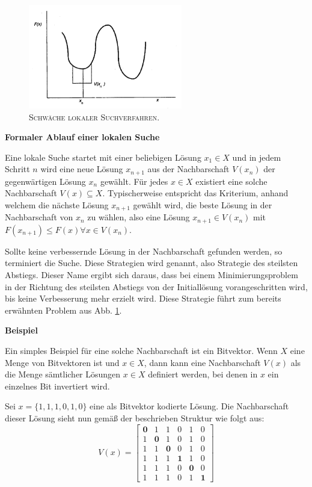 \begin{figure}[H]
\centering
\includegraphics[width=0.6\textwidth]{img/local_minimum.png}
\caption{\textsc{Schwäche lokaler Suchverfahren. \cite{Pirlot1996}}}
\label{fig:local_search_weakness}
\end{figure}

\textbf{Formaler Ablauf einer lokalen Suche}

Eine lokale Suche startet mit einer beliebigen Lösung $x_1 \in X$ und in jedem Schritt $n$
wird eine neue Lösung $x_{n+1}$ aus der Nachbarschaft $V(x_n)$ der gegenwärtigen Lösung $x_n$ gewählt.
Für jedes $x \in X$ existiert eine solche Nachbarschaft $V(x) \subseteq X$.
Typischerweise entspricht das Kriterium, anhand welchem die nächste Lösung $x_{n+1}$ gewählt wird,
die beste Lösung in der Nachbarschaft von $x_n$ zu wählen, also eine Lösung $x_{n+1} \in V(x_n)$
mit $F(x_{n+1}) \leq F(x) \forall x \in V(x_n)$. \cite{Pirlot1996}

Sollte keine verbessernde Lösung in der Nachbarschaft gefunden werden, so terminiert die Suche.
Diese Strategien wird  genannt, also Strategie des steilsten Abstiegs.
Dieser Name ergibt sich daraus, dass bei einem Minimierungsproblem in der Richtung des steilsten Abstiegs
von der Initiallösung vorangeschritten wird, bis keine Verbesserung mehr erzielt wird. Diese Strategie führt zum
bereits erwähnten Problem aus Abb. \ref{fig:local_search_weakness}.

\textbf{Beispiel}

Ein simples Beispiel für eine solche Nachbarschaft ist ein Bitvektor. Wenn $X$ eine Menge
von Bitvektoren ist und $x \in X$, dann kann eine Nachbarschaft $V(x)$ als die Menge
sämtlicher Lösungen $x \in X$ definiert werden, bei denen in $x$ ein einzelnes Bit invertiert wird. \cite{Pirlot1996}

Sei $x = \{1, 1, 1, 0, 1, 0\}$ eine als Bitvektor kodierte Lösung.
Die Nachbarschaft dieser Lösung sieht nun gemäß der beschrieben Struktur wie folgt aus:
\[
V(x) =
  \begin{bmatrix}
    \boldsymbol{0} & 1 & 1 & 0 & 1 & 0 \\
    1 & \boldsymbol{0} & 1 & 0 & 1 & 0 \\
    1 & 1 & \boldsymbol{0} & 0 & 1 & 0 \\
    1 & 1 & 1 & \boldsymbol{1} & 1 & 0 \\
    1 & 1 & 1 & 0 & \boldsymbol{0} & 0 \\
    1 & 1 & 1 & 0 & 1 & \boldsymbol{1}
  \end{bmatrix}
\]

